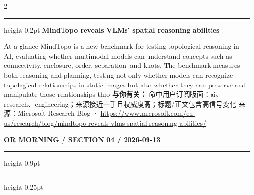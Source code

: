 \documentclass[10.5pt]{ctexart}
\begin{document}
\begin{multicols}{2}
\vspace{2mm}
\hrule height 0.2pt
\vspace{2mm}
{\large\bfseries MindTopo reveals VLMs’ spatial reasoning abilities}\par
At a glance MindTopo is a new benchmark for testing topological reasoning in AI, evaluating whether multimodal models can understand concepts such as connectivity, enclosure, order, separation, and knots. The benchmark measures both reasoning and planning, testing not only whether models can recognize topological relationships in static images but also whether they can preserve and manipulate those relationships thro
\textbf{与你有关：} 命中用户订阅版面：ai、research、engineering；来源接近一手且权威度高；标题/正文包含高信号变化
{\footnotesize\color{ormuted} 来源：Microsoft Research Blog · \url{https://www.microsoft.com/en-us/research/blog/mindtopo-reveals-vlms-spatial-reasoning-abilities/}}
\end{multicols}
\newpage
{\small\bfseries OR MORNING / SECTION 04 / 2026-09-13}
\vspace{2mm}
\hrule height 0.9pt
\vspace{1.5mm}
\hrule height 0.25pt
\vspace{4mm}
\end{document}
